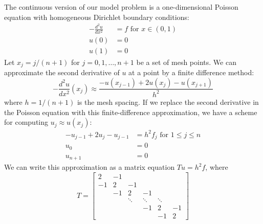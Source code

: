 \documentclass[12pt, leqno]{article} %
\begin{document}
The continuous version of our model problem is a one-dimensional
Poisson equation with homogeneous Dirichlet boundary conditions:
\begin{align*}
  -\frac{d^2 u}{dx^2} &= f \mbox{ for } x \in (0,1) \\
  u(0) & = 0 \\
  u(1) & = 0
\end{align*}
Let $x_j = j/(n+1)$ for $j = 0, 1, \ldots, n+1$ be a set of mesh points.
We can approximate the second derivative of $u$ at a point by
a finite difference method:
\[
  -\frac{d^2 u}{dx^2}(x_j) \approx
    \frac{-u(x_{j-1})+2u(x_j)-u(x_{j+1})}{h^2}
\]
where $h = 1/(n+1)$ is the mesh spacing.  If we replace the second
derivative in the Poisson equation with this finite-difference approximation,
we have a scheme for computing $u_j \approx u(x_j)$:
\begin{align*}
  -u_{j-1} + 2u_j - u_{j-1} &= h^2 f_j \mbox{ for } 1 \leq j \leq n \\
  u_0 & = 0 \\
  u_{n+1} & = 0
\end{align*}
We can write this approximation as a matrix equation $Tu = h^2 f$, where
\[
  T = \begin{bmatrix}
      2 & -1 \\
      -1 & 2 & -1 \\
         & -1 & 2 & -1 \\
         &    & \ddots & \ddots & \ddots \\
         &    &        & -1 & 2      & -1 \\
         &    &        &    & -1      & 2
      \end{bmatrix}
\]
\end{document}
